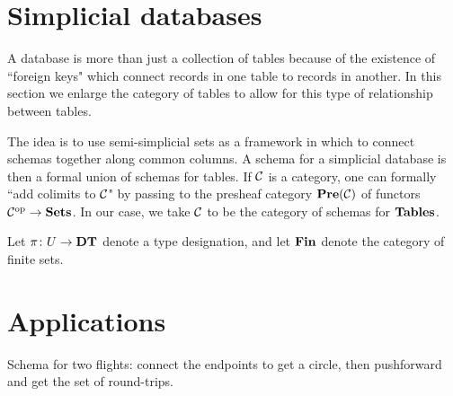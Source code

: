\documentclass{amsart}
\def\DT{{\bf DT}}
\def\Tables{{\bf Tables}}
\def\Fin{{\bf Fin}}
\begin{document}

\section{Simplicial databases}

A database is more than just a collection of tables because of the existence of ``foreign keys" which connect records in one table to records in another.  In this section we enlarge the category of tables to allow for this type of relationship between tables.

The idea is to use semi-simplicial sets as a framework in which to connect schemas together along common columns.  A schema for a simplicial database is then a formal union of schemas for tables.  If $\mathcal{C}$ is a category, one can formally ``add colimits to $\mathcal{C}$" by passing to the presheaf category ${\bf Pre}(\mathcal{C})$ of functors $\mathcal{C}^\textnormal{op}\rightarrow{\bf Sets}$.  In our case, we take $\mathcal{C}$ to be the category of schemas for $\Tables$.  

\begin{lemma}

Let $\pi\taking U\to\DT$ denote a type designation, and let $\Fin$ denote the category of finite sets.


\end{lemma}

\section{Applications}

Schema for two flights: connect the endpoints to get a circle, then pushforward and get the set of round-trips.
\end{document}
